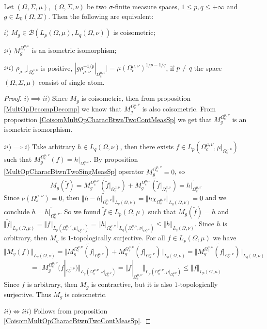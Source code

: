 \begin{proposition}\label{CoisomMultOpCharacBtwnTwoMeasSp} Let $(\Omega,\Sigma,\mu)$, $(\Omega,\Sigma,\nu)$ be two $\sigma$-finite measure spaces, $1\leq p,q\leq +\infty$ and $g\in L_0(\Omega,\Sigma)$. Then the following are equivalent: 

$i)$ $M_g\in\mathcal{B}(L_p(\Omega,\mu), L_q(\Omega,\nu))$ is coisometric;

$ii)$ $M_g^{\Omega_c^{\mu,\nu}}$ is an isometric isomorphism;

$iii)$ $\rho_{\mu,\nu}|_{\Omega_c^{\mu,\nu}}$ is positive, $|g \rho_{\mu,\nu}^{-1/p}|_{\Omega_c^{\mu,\nu}}|=\mu(\Omega_c^{\mu,\nu})^{1/p-1/q}$, if $p\neq q$ the space $(\Omega,\Sigma,\mu)$ consist of single atom.
\end{proposition}
\begin{proof} $i)$$\implies$$ ii)$ Since $M_g$ is coisometric, then from proposition \ref{MultOpDecompDecomp} we know that $M_g^{\Omega_c^{\mu,\nu}}$ is also coisometric. From proposition \ref{CoisomMultOpCharacBtwnTwoContMeasSp} we get that $M_g^{\Omega_c^{\mu,\nu}}$ is an isometric isomorphism. 

$ii)$$\implies$$ i)$ Take arbitrary $h\in L_q(\Omega,\nu)$, then there exists $f\in L_p(\Omega_c^{\mu,\nu},\mu|_{\Omega_c^{\mu,\nu}})$ such that $M_g^{\Omega_c^{\mu,\nu}}(f)=h|_{\Omega_c^{\mu,\nu}}$. By proposition \ref{MultOpCharacBtwnTwoSingMeasSp} operator $M_g^{\Omega_s^{\mu,\nu}}=0$, so
$$
M_g(\widetilde{f})
=\widetilde{M_g^{\Omega_c^{\mu,\nu}}(\widetilde{f}|_{\Omega_c^{\mu,\nu}})}+\widetilde{M_g^{\Omega_s^{\mu,\nu}}(\widetilde{f}|_{\Omega_s^{\mu,\nu}})}
=\widetilde{h|_{\Omega_c^{\mu,\nu}}}
$$
Since $\nu(\Omega_s^{\mu,\nu})=0$, then $\Vert h-\widetilde{h|_{\Omega_c^{\mu,\nu}}}\Vert_{L_q(\Omega,\nu)}=\Vert h\chi_{\Omega_s^{\mu,\nu}}\Vert_{L_q(\Omega,\nu)}=0$ and we conclude $h=\widetilde{h|_{\Omega_c^{\mu,\nu}}}$. So we found $\widetilde{f}\in L_p(\Omega,\mu)$ such that $M_g(\widetilde{f})=h$ and $\Vert \widetilde{f}\Vert_{L_p(\Omega,\mu)}=\Vert f\Vert_{L_p(\Omega_c^{\mu,\nu},\mu|_{\Omega_c^{\mu,\nu}})}=\Vert h|_{\Omega_c^{\mu,\nu}}\Vert_{L_q(\Omega_c^{\mu,\nu},\nu|_{\Omega_c^{\mu,\nu}})}\leq\Vert h\Vert_{L_q(\Omega,\nu)}$. Since $h$ is arbitrary, then $M_g$ is $1$-topologically surjective. For all $f\in L_p(\Omega,\mu)$ we have
$$
\Vert M_g(f)\Vert_{L_q(\Omega,\nu)}
=\Vert\widetilde{M_g^{\Omega_c^{\mu,\nu}}(f|_{\Omega_c^{\mu,\nu}})}+\widetilde{M_g^{\Omega_s^{\mu,\nu}}(f|_{\Omega_s^{\mu,\nu}})}\Vert_{L_q(\Omega,\nu)}
=\Vert\widetilde{M_g^{\Omega_c^{\mu,\nu}}(f|_{\Omega_c^{\mu,\nu}})}\Vert_{L_q(\Omega,\nu)}
$$
$$
=\Vert M_g^{\Omega_c^{\mu,\nu}}(f|_{\Omega_c^{\mu,\nu}})\Vert_{L_q(\Omega_c^{\mu,\nu},\nu|_{\Omega_c^{\mu,\nu}})}
=\Vert f|_{\Omega_c^{\mu,\nu}}\Vert_{L_p(\Omega_c^{\mu,\nu},\mu|_{\Omega_c^{\mu,\nu}})}
\leq\Vert f \Vert_{L_p(\Omega,\mu)}
$$
Since $f$ is arbitrary, then $M_g$ is contractive, but it is also $1$-topologically surjective. Thus $M_g$ is coisometric.

$ii)\Longleftrightarrow iii)$ Follows from proposition \ref{CoisomMultOpCharacBtwnTwoContMeasSp}.
\end{proof}

